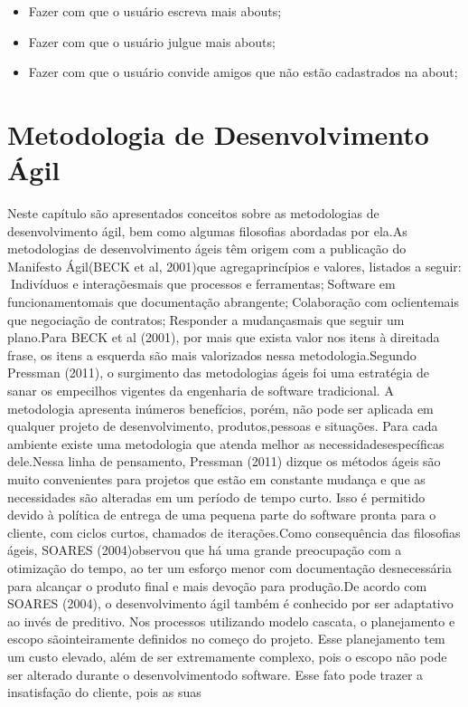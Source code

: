 \begin{itemize}
    \item Fazer com que o usuário escreva mais abouts;
    \item Fazer com que o usuário julgue mais abouts;
    \item Fazer com que o usuário convide amigos que não estão cadastrados na about;
\end{itemize}

\section{Metodologia de Desenvolvimento Ágil}
\label{sec:section_name}
Neste  capítulo  são  apresentados  conceitos  sobre  as  metodologias  de desenvolvimento ágil, bem como algumas filosofias abordadas por ela.As metodologias de desenvolvimento ágeis têm origem com a publicação do  Manifesto Ágil(BECK  et  al,  2001)que  agregaprincípios  e  valores,  listados  a seguir: Indivíduos e interaçõesmais que processos e ferramentas;Software em funcionamentomais que documentação abrangente;Colaboração com oclientemais que negociação de contratos;Responder a mudançasmais que seguir um plano.Para BECK et al (2001), por mais que exista valor nos itens à direitada frase, os itens a esquerda são mais valorizados nessa metodologia.Segundo Pressman (2011), o surgimento das metodologias ágeis foi uma estratégia de sanar os empecilhos vigentes da engenharia de software tradicional. A metodologia apresenta inúmeros benefícios, porém, não pode ser aplicada em qualquer  projeto  de  desenvolvimento,  produtos,pessoas  e  situações.  Para  cada ambiente existe uma metodologia que atenda melhor as necessidadesespecíficas dele.Nessa linha de pensamento, Pressman (2011) dizque os métodos ágeis são muito convenientes para projetos que estão em constante mudança e que as necessidades  são  alteradas  em  um  período  de  tempo  curto.  Isso  é  permitido devido  à  política  de  entrega  de  uma  pequena  parte  do  software  pronta  para  o cliente, com ciclos curtos, chamados de iterações.Como  consequência  das  filosofias  ágeis, SOARES  (2004)observou  que há  uma  grande  preocupação  com  a  otimização  do  tempo,  ao  ter  um  esforço menor  com  documentação  desnecessária  para  alcançar  o  produto  final  e  mais devoção para produção.De  acordo  com SOARES  (2004),  o  desenvolvimento  ágil  também  é conhecido  por  ser  adaptativo  ao  invés  de  preditivo.  Nos processos utilizando modelo cascata, o planejamento e escopo sãointeiramente definidos no começo do projeto. Esse planejamento tem um custo elevado, além de ser extremamente complexo,  pois  o escopo  não  pode  ser  alterado  durante  o desenvolvimentodo software.   Esse   fato pode   trazer   a   insatisfação   do   cliente,   pois   as   suas 

